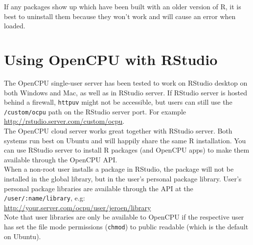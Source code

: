 \documentclass{scrartcl}\usepackage[]{graphicx}\usepackage[]{color}
\begin{document}
\begin{appendices}
\noindent If any packages show up which have been built with an older version of R, it is best to uninstall them because they won't work and will cause an error when loaded.


\section{Using OpenCPU with RStudio}

The OpenCPU single-user server has been tested to work on RStudio desktop on both Windows and Mac, as well as in RStudio server. If RStudio server is hosted behind a firewall, \texttt{httpuv} might not be accessible, but users can still use the \texttt{/custom/ocpu} path on the RStudio server port. For example \url{http://rstudio.server.com/custom/ocpu}.\\

\noindent The OpenCPU cloud server works great together with RStudio server. Both systems run best on Ubuntu and will happily share the same R installation. You can use RStudio server to install R packages (and OpenCPU apps) to make them available through the OpenCPU API. \\

\noindent When a non-root user installs a package in RStudio, the package will not be installed in the global library, but in the user's personal package library. User's personal package libraries are available through the API at the \texttt{/user/:name/library}, e.g: \\

\indent \url{http://your.server.com/ocpu/user/jeroen/library} \\

\noindent Note that user libraries are only be available to OpenCPU if the respective user has set the file mode permissions (\texttt{chmod}) to public readable (which is the default on Ubuntu). 


\end{appendices}
\end{document}
